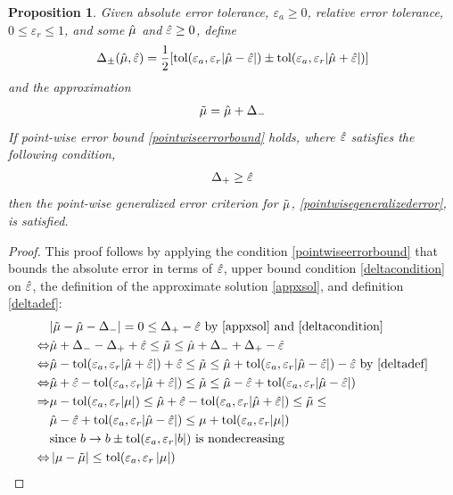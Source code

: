 \documentclass{iitthesis}
\newtheorem{proposition}[theorem]{Proposition}
\begin{document}
\begin{proposition}\label{meanMCgProp}
Given absolute error tolerance, $\varepsilon_a\geq 0$, relative error tolerance, $0 \leq \varepsilon_r\le 1$, and some $\hat{\mu}$ and $\hat{\varepsilon}\geq 0$, define
\begin{align}\Delta_{\pm}(\hat{\mu},\hat{\varepsilon}) = \frac{1}{2} [\text{tol}(\varepsilon_a, \varepsilon_r |\hat{\mu}-\hat{\varepsilon}|) \pm \text{tol}(\varepsilon_a, \varepsilon_r |\hat{\mu}+\hat{\varepsilon}|)] \label{deltadef}
\end{align}
and the approximation
\begin{align}
\tilde{\mu} = \hat{\mu} + \Delta_{-} \label{appxsol}
\end{align}
If point-wise error bound  \eqref{pointwiseerrorbound}  holds, where $\hat{\varepsilon}$ satisfies the following condition,
\begin{align}\Delta_{+} \geq \hat{\varepsilon}\label{deltacondition}
\end{align}
 then the point-wise generalized error criterion for $\tilde{\mu}$, \eqref{pointwisegeneralizederror}, is satisfied. 
 \end{proposition}
 \begin{proof}
 This proof follows by applying the condition \eqref{pointwiseerrorbound}  that bounds the absolute error in terms of $\hat{\varepsilon}$, upper bound condition \eqref{deltacondition} on $\hat{\varepsilon}$, the definition of the approximate solution \eqref{appxsol}, and definition \eqref{deltadef}:
\begin{align*}
&|\tilde{\mu} -\hat{\mu} - \Delta_{-}| = 0 \leq \Delta_{+}- \hat{\varepsilon}  \text{ by } \eqref{appxsol} \text{ and } \eqref{deltacondition} \\ 
\Leftrightarrow 
&\hat{\mu}+\Delta_- - \Delta_{+} + \hat{\varepsilon} \leq \tilde{\mu}  \leq \hat{\mu} +\Delta_{-}+\Delta_{+}-\hat{\varepsilon} \\ \Leftrightarrow 
&\hat{\mu} -\text{tol} (\varepsilon_a, \varepsilon_r |\hat{\mu} +\hat{\varepsilon}|)+ \hat{\varepsilon} \leq \tilde{\mu}  \leq \hat{\mu}  +\text{tol} (\varepsilon_a, \varepsilon_r |\hat{\mu} -\hat{\varepsilon} |)-\hat{\varepsilon}  \text{ by } \eqref{deltadef}\\
\Leftrightarrow 
&\hat{\mu} + \hat{\varepsilon}  -\text{tol} (\varepsilon_a, \varepsilon_r |\hat{\mu} +\hat{\varepsilon} |) \leq \tilde{\mu}  \leq \hat{\mu} -\hat{\varepsilon} +\text{tol} (\varepsilon_a, \varepsilon_r |\hat{\mu} -\hat{\varepsilon} |) \\
\Rightarrow &
\mu -\text{tol} (\varepsilon_a, \varepsilon_r |\mu|) \leq\hat{\mu} + \hat{\varepsilon}  -\text{tol} (\varepsilon_a, \varepsilon_r |\hat{\mu} +\hat{\varepsilon} |) \leq \tilde{\mu}  \leq \\
& \hat{\mu} -\hat{\varepsilon} +\text{tol} (\varepsilon_a, \varepsilon_r |\hat{\mu} -\hat{\varepsilon} |)  \leq \mu+\text{tol} (\varepsilon_a, \varepsilon_r |\mu|) \\
& \text{since } b \to b \pm \text{tol} (\varepsilon_a,\varepsilon_r |b|) \text{ is nondecreasing}\\ 
\Leftrightarrow &
\left \lvert \mu-\tilde{\mu} \right \rvert \leq \text{tol} (\varepsilon_a, \varepsilon_r \left \lvert \mu \right \rvert) 
\end{align*}
\end{proof}
\end{document}
